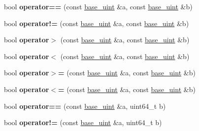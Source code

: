 \begin{DoxyCompactItemize}
\item 
\mbox{\label{classbase__uint_aafca305decdfd2ded4688213ab4a55fa}} 
bool {\bfseries operator==} (const \mbox{\hyperlink{classbase__uint}{base\+\_\+uint}} \&a, const \mbox{\hyperlink{classbase__uint}{base\+\_\+uint}} \&b)
\item 
\mbox{\label{classbase__uint_a3cc3bccf252004fbbd2b96dc769378e7}} 
bool {\bfseries operator!=} (const \mbox{\hyperlink{classbase__uint}{base\+\_\+uint}} \&a, const \mbox{\hyperlink{classbase__uint}{base\+\_\+uint}} \&b)
\item 
\mbox{\label{classbase__uint_ac59719bd052d5dc2afcc35ae4a8843ab}} 
bool {\bfseries operator$>$} (const \mbox{\hyperlink{classbase__uint}{base\+\_\+uint}} \&a, const \mbox{\hyperlink{classbase__uint}{base\+\_\+uint}} \&b)
\item 
\mbox{\label{classbase__uint_a89272b5112f90ba683c0f066ba1426c1}} 
bool {\bfseries operator$<$} (const \mbox{\hyperlink{classbase__uint}{base\+\_\+uint}} \&a, const \mbox{\hyperlink{classbase__uint}{base\+\_\+uint}} \&b)
\item 
\mbox{\label{classbase__uint_a9eb243df5a6dfa3d0cd326427d99bfa6}} 
bool {\bfseries operator$>$=} (const \mbox{\hyperlink{classbase__uint}{base\+\_\+uint}} \&a, const \mbox{\hyperlink{classbase__uint}{base\+\_\+uint}} \&b)
\item 
\mbox{\label{classbase__uint_ac7f1bdba7208bd852f7b00f7c49624f8}} 
bool {\bfseries operator$<$=} (const \mbox{\hyperlink{classbase__uint}{base\+\_\+uint}} \&a, const \mbox{\hyperlink{classbase__uint}{base\+\_\+uint}} \&b)
\item 
\mbox{\label{classbase__uint_a977dbbe7e78bbdcc2aea2dc16292d424}} 
bool {\bfseries operator==} (const \mbox{\hyperlink{classbase__uint}{base\+\_\+uint}} \&a, uint64\+\_\+t b)
\item 
\mbox{\label{classbase__uint_ab7b366cc0883f25fa57fb09d4bc33807}} 
bool {\bfseries operator!=} (const \mbox{\hyperlink{classbase__uint}{base\+\_\+uint}} \&a, uint64\+\_\+t b)
\end{DoxyCompactItemize}


